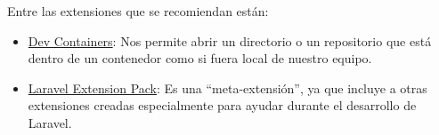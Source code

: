 Entre las extensiones que se recomiendan están:
\begin{itemize}
    \item \href{https://marketplace.visualstudio.com/items?itemName=ms-vscode-remote.remote-containers}{Dev Containers}: Nos permite abrir un directorio o un repositorio que está dentro de un contenedor como si fuera local de nuestro equipo.

    \item \href{https://marketplace.visualstudio.com/items?itemName=onecentlin.laravel-extension-pack}{Laravel Extension Pack}: Es una “meta-extensión”, ya que incluye a otras extensiones creadas especialmente para ayudar durante el desarrollo de Laravel.
\end{itemize}